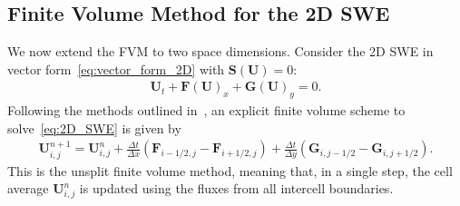 \subsection{Finite Volume Method for the 2D SWE}
We now extend the FVM to two space dimensions.
Consider the 2D SWE in vector form~\eqref{eq:vector_form_2D} with $\mathbf{S(U)} = 0$:
\begin{align}\label{eq:2D_SWE}
    \mathbf{U}_t + \mathbf{F(U)}_x + \mathbf{G(U)}_y = 0.
\end{align}
Following the methods outlined in~\cite{Toro2009-Riemann}, an explicit finite volume scheme to solve~\eqref{eq:2D_SWE} is given by
\begin{align}
    \mathbf{U}_{i,j}^{n+1} = \mathbf{U}_{i,j}^n + \frac{\Delta t}{\Delta x}(\mathbf{F}_{i-1/2,j} - \mathbf{F}_{i+1/2,j}) + \frac{\Delta t}{\Delta y}(\mathbf{G}_{i,j-1/2} - \mathbf{G}_{i,j+1/2}).
\end{align}
This is the unsplit finite volume method, meaning that, in a single step, the cell average $\mathbf{U}_{i,j}^n$ is updated using the fluxes from all intercell boundaries.


